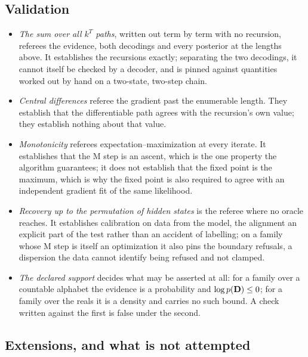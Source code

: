 \documentclass[11pt,a4paper]{article}
\begin{document}
\subsection{Validation}
\label{sec:hmm:validation}
\begin{itemize}
  \item \emph{The sum over all $k^T$ paths}, written out term by term with no
    recursion, referees the evidence, both decodings and every posterior at the
    lengths above. It establishes the recursions exactly; separating the two
    decodings, it cannot itself be checked by a decoder, and is pinned against
    quantities worked out by hand on a two-state, two-step chain.
  \item \emph{Central differences} referee the gradient past the enumerable
    length. They establish that the differentiable path agrees with the
    recursion's own value; they establish nothing about that value.
  \item \emph{Monotonicity} referees expectation--maximization at every
    iterate. It establishes that the M step is an ascent, which is the one
    property the algorithm guarantees; it does not establish that the fixed
    point is the maximum, which is why the fixed point is also required to
    agree with an independent gradient fit of the same likelihood.
  \item \emph{Recovery up to the permutation of hidden states} is the referee
    where no oracle reaches. It establishes calibration on data from the model,
    the alignment an explicit part of the test rather than an accident of
    labelling; on a family whose M step is itself an optimization it also pins
    the boundary refusals, a dispersion the data cannot identify being refused
    and not clamped.
  \item \emph{The declared support} decides what may be asserted at all: for
    a family over a countable alphabet the evidence is a probability and
    $\log p(\mathbf{D}) \le 0$; for a family over the reals it is a density and
    carries no such bound. A check written against the first is false under
    the second.
\end{itemize}

\subsection{Extensions, and what is not attempted}
\label{sec:hmm:extensions}
\end{document}
